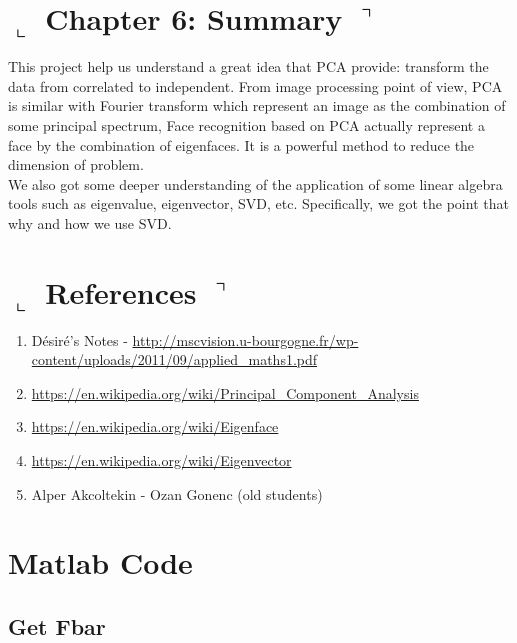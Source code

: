 \documentclass[]{article}
\begin{document}
\section*{ $\llcorner$  Chapter 6: Summary $\urcorner$}

This project help us understand a great idea that PCA provide: transform the data from correlated to independent. From image processing point of view, PCA is similar with Fourier transform which represent an image as the combination of some principal spectrum, Face recognition based on PCA actually represent a face by the combination of eigenfaces. It is a powerful method to reduce the dimension of problem.
\\

We also got some deeper understanding of the application of some linear algebra tools such as eigenvalue, eigenvector, SVD, etc. Specifically, we got the point that why and how we use SVD. 

\section*{ $\llcorner$  References $\urcorner$}
	\begin{enumerate}
		\item Désiré’s Notes - \url{http://mscvision.u-bourgogne.fr/wp-content/uploads/2011/09/applied_maths1.pdf}
		\item \url{https://en.wikipedia.org/wiki/Principal_Component_Analysis}
		\item \url{https://en.wikipedia.org/wiki/Eigenface}
		\item \url{https://en.wikipedia.org/wiki/Eigenvector}
		\item Alper Akcoltekin - Ozan Gonenc (old students)
	\end{enumerate}
	
\section*{Matlab Code}
	\subsection*{Get Fbar}
	
\end{document}
